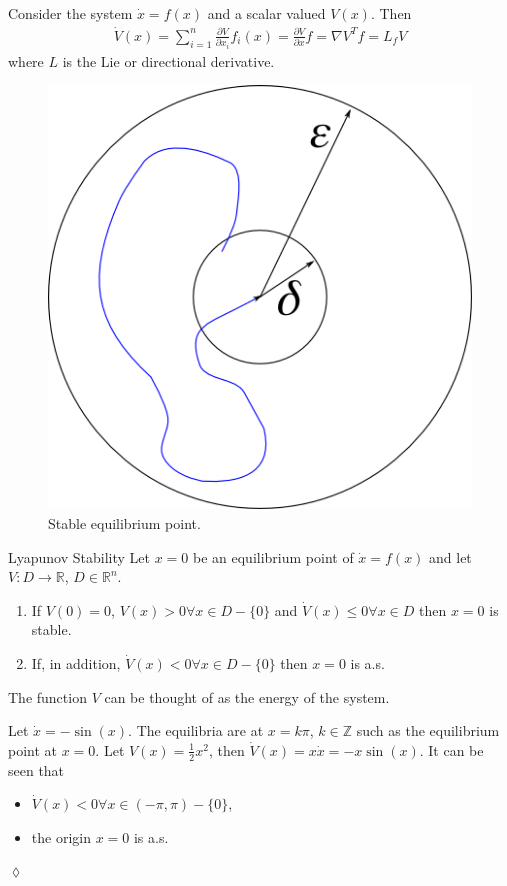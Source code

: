 \begin{definition}
Consider the system $\dot{x}=f(x)$ and a scalar valued $V(x)$.
Then
\begin{align*}
\dot{V}(x) = \sum_{i=1}^n \frac{\partial V}{\partial x_i} f_i(x) = \frac{\partial V}{\partial x}f = \nabla V^T f = L_f V
\end{align*}
where $L$ is the Lie or directional derivative.
\end{definition}

\begin{figure}[ht!]
\centering
\includegraphics[width=.4\textwidth]{images/07attractiveNotStable}
\caption{Stable equilibrium point.}
\label{fig:07attractiveNotStable}
\end{figure}

\begin{theorem}{Lyapunov Stability}
Let $x=0$ be an equilibrium point of $\dot{x}=f(x)$ and let $V:D\to\mathbb{R}$, $D\in\mathbb{R}^n$.
\begin{enumerate}
\item If $V(0)=0$, $V(x)>0 \forall x \in D - \{0\}$ and $\dot{V}(x)\leq0 \forall x\in D$ then $x=0$ is stable.
\item If, in addition, $\dot{V}(x)<0 \forall x\in D-\{0\}$ then $x=0$ is a.s.
\end{enumerate}
\end{theorem}

The function $V$ can be thought of as the energy of the system.

\begin{example}
Let $\dot{x}=-\sin(x)$.
The equilibria are at $x=k\pi$, $k\in\mathbb{Z}$ such as the equilibrium point at $x=0$.
Let $V(x)=\tfrac{1}{2}x^2$, then $\dot{V}(x)=x\dot{x}=-x\sin(x)$.
It can be seen that
\begin{itemize}
\item $\dot{V}(x) < 0 \forall x\in(-\pi,\pi)-\{0\}$,
\item the origin $x=0$ is a.s.
\end{itemize}
$\lozenge$
\end{example}
